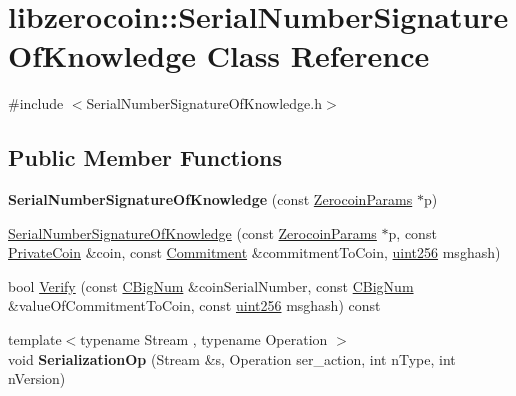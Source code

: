 \hypertarget{classlibzerocoin_1_1_serial_number_signature_of_knowledge}{}\section{libzerocoin\+::Serial\+Number\+Signature\+Of\+Knowledge Class Reference}
\label{classlibzerocoin_1_1_serial_number_signature_of_knowledge}


{\ttfamily \#include $<$Serial\+Number\+Signature\+Of\+Knowledge.\+h$>$}

\subsection*{Public Member Functions}
\begin{DoxyCompactItemize}
\item 
\mbox{\label{classlibzerocoin_1_1_serial_number_signature_of_knowledge_abcbaf654d0d45731bec4c2afd32c76bc}} 
{\bfseries Serial\+Number\+Signature\+Of\+Knowledge} (const \mbox{\hyperlink{classlibzerocoin_1_1_zerocoin_params}{Zerocoin\+Params}} $\ast$p)
\item 
\mbox{\hyperlink{classlibzerocoin_1_1_serial_number_signature_of_knowledge_adb04da379098298cad6e05c930d6483f}{Serial\+Number\+Signature\+Of\+Knowledge}} (const \mbox{\hyperlink{classlibzerocoin_1_1_zerocoin_params}{Zerocoin\+Params}} $\ast$p, const \mbox{\hyperlink{classlibzerocoin_1_1_private_coin}{Private\+Coin}} \&coin, const \mbox{\hyperlink{classlibzerocoin_1_1_commitment}{Commitment}} \&commitment\+To\+Coin, \mbox{\hyperlink{classuint256}{uint256}} msghash)
\item 
bool \mbox{\hyperlink{classlibzerocoin_1_1_serial_number_signature_of_knowledge_a05f9c3d5aade741ee8aab51ed570b6b0}{Verify}} (const \mbox{\hyperlink{class_c_big_num}{C\+Big\+Num}} \&coin\+Serial\+Number, const \mbox{\hyperlink{class_c_big_num}{C\+Big\+Num}} \&value\+Of\+Commitment\+To\+Coin, const \mbox{\hyperlink{classuint256}{uint256}} msghash) const
\item 
\mbox{\label{classlibzerocoin_1_1_serial_number_signature_of_knowledge_a2ce04df85116071e75f8d463e584f4eb}} 
{\footnotesize template$<$typename Stream , typename Operation $>$ }\\void {\bfseries Serialization\+Op} (Stream \&s, Operation ser\+\_\+action, int n\+Type, int n\+Version)
\end{DoxyCompactItemize}
